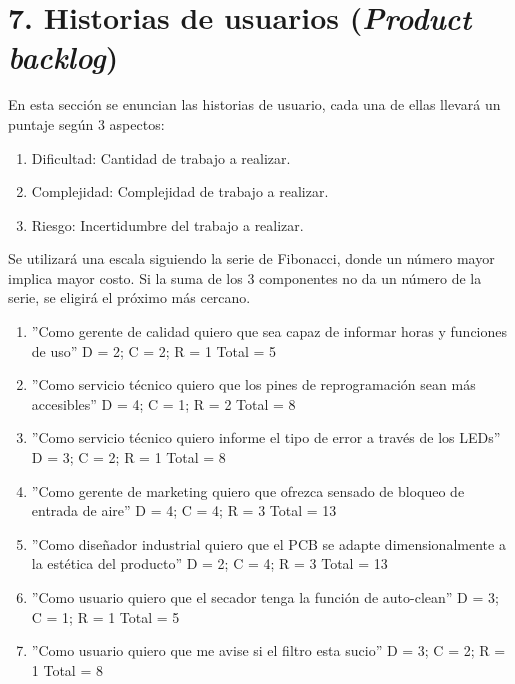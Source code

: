 \documentclass[
11pt, %
codirector, %
]{charter}
\begin{document}
\section{7. Historias de usuarios (\textit{Product backlog})}
\label{sec:backlog}

En esta sección se enuncian las historias de usuario, cada una de ellas llevará un puntaje según
3 aspectos:
\begin{enumerate}
	\item Dificultad: Cantidad de trabajo a realizar.
	\item Complejidad: Complejidad de trabajo a realizar.
	\item Riesgo: Incertidumbre del trabajo a realizar.
\end{enumerate}
Se utilizará una escala siguiendo la serie de Fibonacci, donde un número mayor implica mayor
costo. Si la suma de los 3 componentes no da un número de la serie, se eligirá el próximo más
cercano.

\begin{enumerate}
	\item ''Como gerente de calidad quiero que sea capaz de informar horas y funciones de uso''\newline
	      D = 2; C = 2; R = 1  Total = 5
	\item ''Como servicio técnico quiero que los pines de reprogramación sean más accesibles''\newline
	      D = 4; C = 1; R = 2  Total = 8
	\item ''Como servicio técnico quiero informe el tipo de error a través de los LEDs''\newline
	      D = 3; C = 2; R = 1  Total = 8
	\item ''Como gerente de marketing quiero que ofrezca sensado de bloqueo de entrada de aire''\newline
	      D = 4; C = 4; R = 3  Total = 13
	\item ''Como diseñador industrial quiero que el PCB se adapte dimensionalmente a la estética del producto''\newline
	      D = 2; C = 4; R = 3  Total = 13
	\item ''Como usuario quiero que el secador tenga la función de auto-clean''\newline
	      D = 3; C = 1; R = 1  Total = 5
	\item ''Como usuario quiero que me avise si el filtro esta sucio''\newline
	      D = 3; C = 2; R = 1  Total = 8
\end{enumerate}
\end{document}
